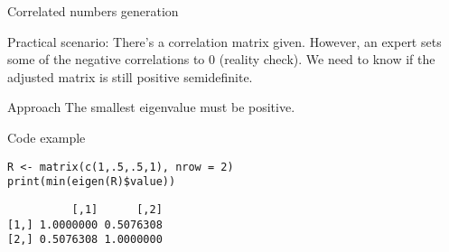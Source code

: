 \documentclass[presentation]{beamer}
\begin{document}
\begin{frame}[fragile,label=sec-3-3]{Correlated numbers generation}
 \begin{block}{Practical scenario:}
There's a correlation matrix given. However, an expert sets some of the negative correlations to 0 (reality check).
We need to know if the adjusted matrix is still positive semidefinite.
\end{block}
\begin{block}{Approach}
The smallest eigenvalue must be positive.
\end{block}
\begin{block}{Code example}
\begin{verbatim}
R <- matrix(c(1,.5,.5,1), nrow = 2)
print(min(eigen(R)$value))
\end{verbatim}

\begin{verbatim}
          [,1]      [,2]
[1,] 1.0000000 0.5076308
[2,] 0.5076308 1.0000000
\end{verbatim}
\end{block}
\end{frame}
\end{document}
